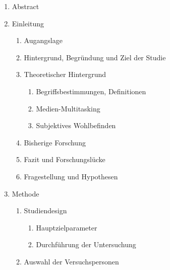 %
%
\label{chap.gliederung}
\glsresetall

\begin{enumerate}
    \item Abstract
    \item Einleitung
    \begin{enumerate}
        \item Augangslage
        \item Hintergrund, Begründung und Ziel der Studie
        \item Theoretischer Hintergrund
        \begin{enumerate}
            \item Begriffsbestimmungen, Definitionen 
            \item Medien-Multitasking
            \item Subjektives Wohlbefinden
        \end{enumerate}
        \item Bisherige Forschung
        \item Fazit und Forschungslücke    
        \item Fragestellung und Hypothesen
    \end{enumerate}
    \item Methode
    \begin{enumerate}
        \item Studiendesign
        \begin{enumerate}
            \item Hauptzielparameter
            \item Durchführung der Untersuchung
        \end{enumerate}
        \item Auswahl der Versuchspersonen
        \begin{enumerate}

\end{enumerate}
\end{enumerate}
\end{enumerate}
